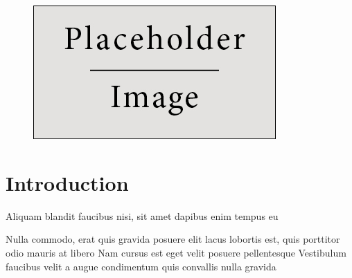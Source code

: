\documentclass[
paper=landscape,
paper=160mm:90mm, %
fontsize=11pt, %
pagesize, %
parskip=half-, %
]{scrartcl} %
\theoremstyle{mythmstyle} %
\begin{document}
\begin{figure}[h]
\centering\includegraphics[width=0.4\linewidth]{placeholder}
\end{figure}

\clearpage




\section{Introduction}


\begin{outline}

\1 Aliquam blandit faucibus nisi, sit amet dapibus enim tempus eu

\2 Nulla commodo, erat quis gravida posuere
\1 elit lacus lobortis est, quis porttitor odio mauris at libero
\1 Nam cursus est eget velit posuere pellentesque
\1 Vestibulum faucibus velit a augue condimentum quis convallis nulla gravida

\end{outline}


\clearpage


\end{document}
